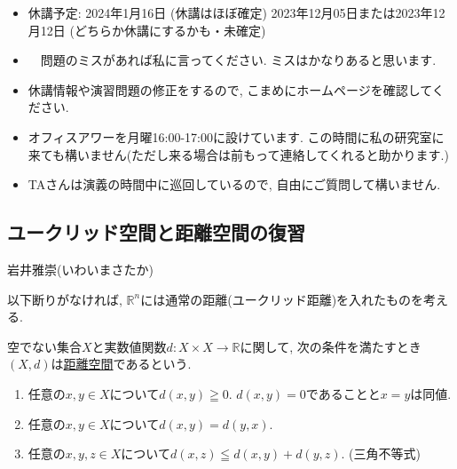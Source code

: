 \documentclass[dvipdfmx,a4paper,11pt]{article}
\newcommand{\R}{\mathbb{R}}
\theoremstyle{definition}
\begin{document}
\vspace{11pt}
\begin{itemize}
  \setlength{\parskip}{0cm} %
  \setlength{\itemsep}{0cm} %
  \item 休講予定: 2024年1月16日 (休講はほぼ確定) 2023年12月05日または2023年12月12日 (どちらか休講にするかも・未確定)
    \item　問題のミスがあれば私に言ってください. ミスはかなりあると思います. 
  \item 休講情報や演習問題の修正をするので, こまめにホームページを確認してください.
    \item オフィスアワーを月曜16:00-17:00に設けています. この時間に私の研究室に来ても構いません(ただし来る場合は前もって連絡してくれると助かります.)
    \item TAさんは演義の時間中に巡回しているので, 自由にご質問して構いません. 
 \end{itemize}
 
\newpage

\begin{center}
\section{ユークリッド空間と距離空間の復習}
\label{sec-euc}
\end{center}
\begin{flushright}
 岩井雅崇(いわいまさたか)
\end{flushright}

以下断りがなければ, $\R^{n}$には通常の距離(ユークリッド距離)を入れたものを考える. 
\begin{tcolorbox}[
    colback = white,
    colframe = green!35!black,
    fonttitle = \bfseries,
    breakable = true]
    空でない集合$X$と実数値関数$d : X \times X \rightarrow \R$に関して, 次の条件を満たすとき$(X,d)$は\underline{距離空間}であるという.
    \begin{enumerate}
    \setlength{\parskip}{0cm} 
  \setlength{\itemsep}{0cm} 
    \item 任意の$x,y \in X$について$d(x,y) \geqq 0$. $d(x,y)=0$であることと$x=y$は同値. 
    \item 任意の$x,y \in X$について$d(x,y)=d(y,x)$.
    \item 任意の$x,y,z \in X$について$d(x,z) \leqq d(x,y) + d(y,z)$. (三角不等式)
    \end{enumerate}
 \end{tcolorbox}
 
\end{document}
